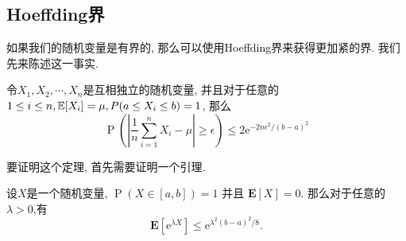 \subsection{Hoeffding界}

如果我们的随机变量是有界的, 那么可以使用Hoeffding界来获得更加紧的界. 我们先来陈述这一事实. 

\begin{theorem}[Hoeffding界]
    令$X_1, X_2, \cdots, X_n$是互相独立的随机变量, 并且对于任意的$1\leq i\leq n, \mathbb E[X_i]=\mu, P(a\leq X_i \leq b)=1$, 那么
    $$
\operatorname{P}\left(\left|\frac{1}{n} \sum_{i=1}^n X_i-\mu\right| \geq \epsilon\right) \leq 2 \mathrm{e}^{-2 n \epsilon^2 /(b-a)^2}
$$
\end{theorem}

要证明这个定理, 首先需要证明一个引理. 
\begin{lemma}
    设$X$是一个随机变量, $\operatorname{P}(X \in[a, b])=1$ 并且 $\mathbf{E}[X]=0$. 那么对于任意的 $\lambda>0$,有
    $$
\mathbf{E}\left[\mathrm{e}^{\lambda X}\right] \leq \mathrm{e}^{\lambda^2(b-a)^2 / 8} .
$$
\end{lemma}

